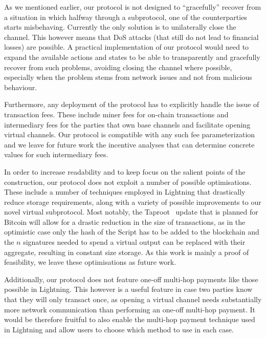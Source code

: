   As we mentioned earlier, our protocol is not designed to ``gracefully'' recover
  from a situation in which halfway through a subprotocol, one of the
  counterparties starts misbehaving. Currently the only solution is to
  unilaterally close the channel. This however means that DoS attacks (that
  still do not lead to financial losses) are possible. A practical
  implementation of our protocol would need to expand the available actions and
  states to be able to transparently and gracefully recover from such problems,
  avoiding closing the channel where possible, especially when the problem stems
  from network issues and not from malicious behaviour.

  Furthermore, any deployment of the protocol
  has to explicitly handle the issue of
   transaction fees. These include miner fees for on-chain transactions and intermediary fees
  for the parties that own base channels and facilitate opening virtual
  channels. Our protocol is compatible with any such fee parameterization and 
  we leave for future work the incentive analyses that can determine concrete
  values for such intermediary fees. 

  In order to increase readability and to keep focus on the salient points of
  the construction, our protocol does not exploit a number of possible
  optimisations. These include a number of techniques employed in Lightning that
  drastically reduce storage requirements, along with a variety of possible
  improvements to our novel virtual subprotocol. Most notably, the
  Taproot~\cite{taproot} update that is planned for Bitcoin will allow for a
  drastic reduction in the size of transactions, as in the optimistic case only
  the hash of the Script has to be added to the blockchain and the $n$
  signatures needed to spend a virtual output can be replaced with their
  aggregate, resulting in constant size storage. As this work is mainly a proof of
  feasibility, we leave these optimisations as future work.

  Additionally, our protocol does not feature one-off multi-hop payments like
  those possible in Lightning. This however is a useful feature in case two
  parties know that they will only transact once, as opening a virtual channel
  needs substantially more network communication than performing an one-off
  multi-hop payment. It would be therefore fruitful to also enable the multi-hop
  payment technique used in Lightning and allow users to choose which method to
  use in each case.

